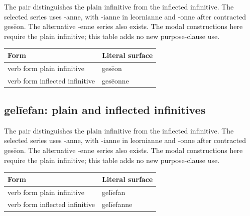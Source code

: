 The pair distinguishes the plain infinitive from the inflected infinitive. The selected series uses -anne, with -ianne in leornianne and -onne after contracted gesēon. The alternative -enne series also exists. The modal constructions here require the plain infinitive; this table adds no new purpose-clause use.

\par\begingroup
\fontsize{10.5}{13.2}\selectfont
\setlength{\LTleft}{0pt}\setlength{\LTright}{\fill}
\noindent
\begin{tabular}{@{}>{\raggedright\arraybackslash}p{76.37mm}>{\raggedright\arraybackslash}p{44.82mm}@{}}
\toprule
\textbf{Form} & \textbf{Literal surface} \\
\midrule
verb form plain infinitive & gesēon \\
verb form inflected infinitive & gesēonne \\
\bottomrule
\end{tabular}
\par\endgroup

\subsection*{gelīefan: plain and inflected infinitives}

The pair distinguishes the plain infinitive from the inflected infinitive. The selected series uses -anne, with -ianne in leornianne and -onne after contracted gesēon. The alternative -enne series also exists. The modal constructions here require the plain infinitive; this table adds no new purpose-clause use.

\par\begingroup
\fontsize{10.5}{13.2}\selectfont
\setlength{\LTleft}{0pt}\setlength{\LTright}{\fill}
\noindent
\begin{tabular}{@{}>{\raggedright\arraybackslash}p{73.68mm}>{\raggedright\arraybackslash}p{47.51mm}@{}}
\toprule
\textbf{Form} & \textbf{Literal surface} \\
\midrule
verb form plain infinitive & gelīefan \\
verb form inflected infinitive & gelīefanne \\
\bottomrule
\end{tabular}
\par\endgroup

